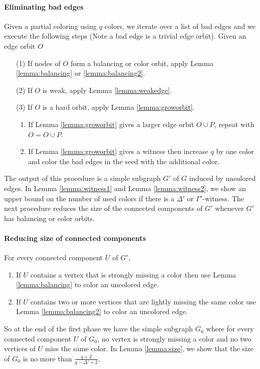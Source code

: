 \documentclass[titlepage, 11pt]{article}
\begin{document}
\paragraph{Eliminating bad edges}
\label{sec:bad}
Given a partial coloring using $q$ colors, we iterate over a list of bad edges and we execute the following steps (Note a bad edge is a trivial edge orbit).
Given an edge orbit $O$ 
\begin{enumerate}
\item[(1)] If nodes of $O$ form a balancing or color orbit, 
apply Lemma \ref{lemma:balancing} or \ref{lemma:balancing2}.
\item[(2)] If $O$ is weak, apply Lemma \ref{lemma:weakedge}.
\item[(3)] If $O$ is a hard orbit, apply Lemma \ref{lemma:groworbit}.
\begin{enumerate}
\item If Lemma \ref{lemma:groworbit} gives a larger edge orbit $O \cup P$, repeat with $O = O \cup P$.
\item If Lemma \ref{lemma:groworbit} gives a witness then increase $q$ by one color and color the bad edges in the seed with the additional color.
\end{enumerate}
\end{enumerate}
\vspace{11 pt}
The output of this procedure is a simple subgraph $G'$ of $G$ induced by uncolored edges. 
In Lemma \ref{lemma:witness1} and Lemma \ref{lemma:witness2},
we show an upper bound on the number of used colors if there is a $\Delta'$ or $\Gamma'$-witness. The next procedure reduces the size of the connected components of $G'$ whenever $G'$ has balancing or color orbits.

\paragraph{Reducing size of connected components}
\label{sec:size}
For every connected component $U$ of $G'$, 
\begin{enumerate}
\item If $U$ contains a vertex that is strongly missing a color then use Lemma \ref{lemma:balancing} to color an uncolored edge.
\item If $U$ contains two or more vertices that are lightly missing the same color use Lemma \ref{lemma:balancing2} to color an uncolored edge.
\end{enumerate}
So at the end of the first phase we have the simple subgraph $G_0$ where for every connected component $U$ of $G_0$,
 no vertex is strongly missing a color and no two vertices of $U$ miss the same color. 
 In Lemma \ref{lemma:size}, we show that the size of $G_0$ is no more than $\frac{q + 2}{q  - \Delta' + 2}$.
\end{document}
